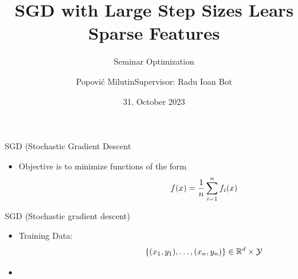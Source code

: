 \documentclass[fleqn]{beamer}
\title
{SGD with Large Step Sizes Lears Sparse Features}
\subtitle{Seminar Optimization}
\author[Popović Milutin]
{Popović Milutin\newline\newline Supervisor: Radu Ioan Bot}
\date{31. October 2023}
\begin{document}
    \begin{frame}
        \titlepage
    \end{frame}

    \begin{frame}{SGD (Stochastic Gradient Descent}
        \begin{itemize}
            \item Objective is to minimize functions of the
                form
                \begin{align*}
                    \hspace{0.3\linewidth}
                    f(x) = \frac{1}{n} \sum_{i=1}^{n} f_i(x)
            \end{align*}
        \end{itemize}
    \end{frame}

    \begin{frame}{SGD (Stochastic gradient descent)}
        \begin{itemize}
            \item Training Data:
                \begin{align*}
                    \hspace{0.3\linewidth}
                    \{(x_1, y_1),\ldots,(x_n,y_n)\} \in \mathbb{R}^{d} \times
                    \mathcal{Y}
            \end{align*}
        \item \mbox{}
        \end{itemize}
    \end{frame}
\end{document}
